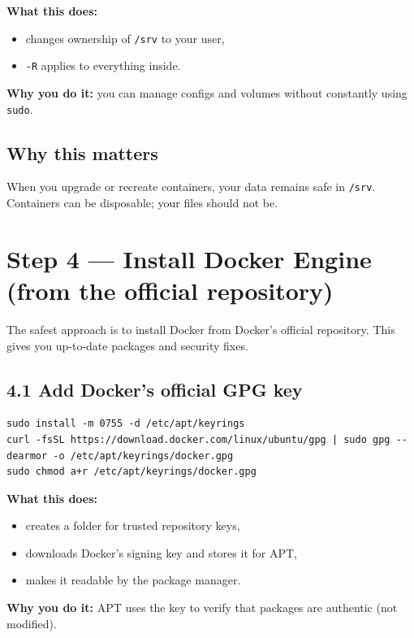 \textbf{What this does:}
\begin{itemize}[leftmargin=*]
  \item changes ownership of \texttt{/srv} to your user,
  \item \texttt{-R} applies to everything inside.
\end{itemize}

\textbf{Why you do it:} you can manage configs and volumes without constantly using \texttt{sudo}.

\subsection{Why this matters}
When you upgrade or recreate containers, your data remains safe in \texttt{/srv}.
Containers can be disposable; your files should not be.

\section{Step 4 --- Install Docker Engine (from the official repository)}
The safest approach is to install Docker from Docker's official repository.
This gives you up-to-date packages and security fixes.

\subsection{4.1 Add Docker's official GPG key}
\begin{lstlisting}
sudo install -m 0755 -d /etc/apt/keyrings
curl -fsSL https://download.docker.com/linux/ubuntu/gpg | sudo gpg --dearmor -o /etc/apt/keyrings/docker.gpg
sudo chmod a+r /etc/apt/keyrings/docker.gpg
\end{lstlisting}

\textbf{What this does:}
\begin{itemize}[leftmargin=*]
  \item creates a folder for trusted repository keys,
  \item downloads Docker's signing key and stores it for APT,
  \item makes it readable by the package manager.
\end{itemize}

\textbf{Why you do it:} APT uses the key to verify that packages are authentic (not modified).



